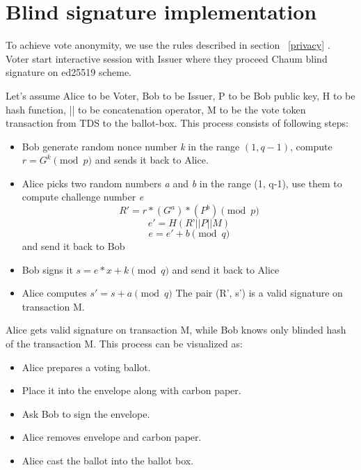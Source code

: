 \documentclass[runningheads]{llncs}
\begin{document}



\section{Blind signature implementation}

To achieve vote anonymity, we use the rules described in section ~\ref{privacy} . Voter start interactive session with Issuer where they proceed Chaum blind signature \cite{blindsignatureschaum} on ed25519 scheme. 

Let's assume Alice to be Voter, Bob to be Issuer, P to be Bob public key, H to be hash function, || to be concatenation operator, M to be the vote token transaction from TDS to the ballot-box.
This process consists of following steps:
\begin{itemize}
\item Bob generate random nonce number \textit{k} in the range $(1, q-1)$, compute 
\(r = G^k \pmod{p}\)
and sends it back to Alice.
\item Alice picks two random numbers \textit{a} and \textit{b} in the range (1, q-1), use them to compute challenge number \textit{e}
\[R' = r*(G^a)*(P^b) \pmod{p}\]
\[e' = H(R’|| P || M)\]
\[e = e' + b \pmod{q}\]
and send it back to Bob
\item Bob signs it 
\(s = e*x + k \pmod{q}\)
and send it back to Alice
\item Alice computes 
$s' = s + a \pmod{q}$
The pair (R', s') is a valid signature on transaction M.
\end{itemize}
Alice gets valid signature on transaction M, while Bob knows only blinded hash of the transaction M.
This process can be visualized as:
\begin{itemize}
    \item Alice prepares a voting ballot.
    \item Place it into the envelope along with carbon paper.
    \item Ask Bob to sign the envelope.
    \item Alice removes envelope and carbon paper.
    \item Alice cast the ballot into the ballot box.
\end{itemize}
\end{document}
